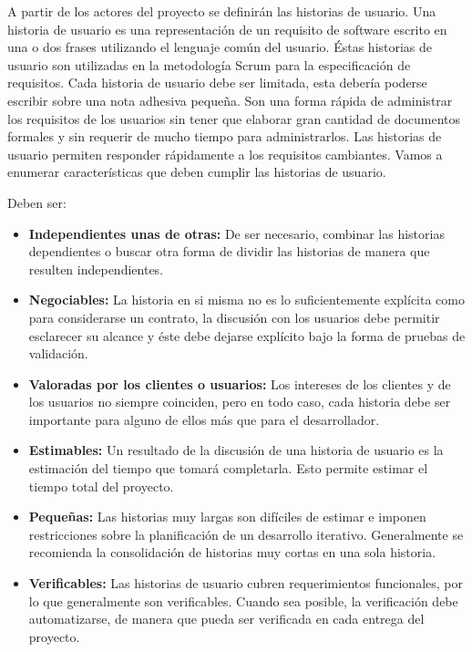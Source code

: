 \documentclass[12pt,a4paper,spanish]{book} %
\begin{document}
\lettrine{A}{} partir de los actores del proyecto se definirán las historias de usuario. Una historia de usuario es una representación de un requisito de software escrito en una o dos frases utilizando el lenguaje común del usuario. Éstas historias de usuario son utilizadas en la metodología Scrum para la especificación de requisitos. Cada historia de usuario debe ser limitada, esta debería poderse escribir sobre una nota adhesiva pequeña. Son una forma rápida de administrar los requisitos de los usuarios sin tener que elaborar gran cantidad de documentos formales y sin requerir de mucho tiempo para administrarlos. Las historias de usuario permiten responder rápidamente a los requisitos cambiantes. Vamos a enumerar características que deben cumplir las historias de usuario.

Deben ser:

\begin{itemize}
\item\textbf{Independientes unas de otras:} De ser necesario, combinar las historias dependientes o buscar otra forma de dividir las historias de manera que resulten independientes.

\item\textbf{Negociables:} La historia en si misma no es lo suficientemente explícita como para considerarse un contrato, la discusión con los usuarios debe permitir esclarecer su alcance y éste debe dejarse explícito bajo la forma de pruebas de validación.

\item\textbf{Valoradas por los clientes o usuarios:} Los intereses de los clientes y de los usuarios no siempre coinciden, pero en todo caso, cada historia debe ser importante para alguno de ellos más que para el desarrollador.

\item\textbf{Estimables:} Un resultado de la discusión de una historia de usuario es la estimación del tiempo que tomará completarla. Esto permite estimar el tiempo total del proyecto.

\item\textbf{Pequeñas:} Las historias muy largas son difíciles de estimar e imponen restricciones sobre la planificación de un desarrollo iterativo. Generalmente se recomienda la consolidación de historias muy cortas en una sola historia.

\item\textbf{Verificables:} Las historias de usuario cubren requerimientos funcionales, por lo que generalmente son verificables. Cuando sea posible, la verificación debe automatizarse, de manera que pueda ser verificada en cada entrega del proyecto.

\end{itemize}
\end{document}
